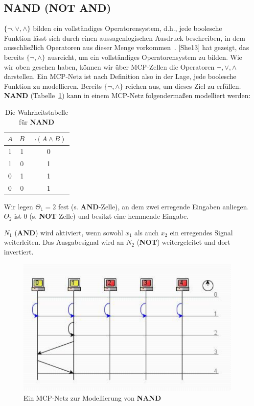 {\subsection*{NAND (NOT AND)}

$\{\neg, \lor, \land\}$ bilden ein vollständiges Operatorensystem, d.h., jede boolesche Funktion lässt sich durch einen aussagenlogischen Ausdruck  beschreiben, in dem ausschließlich Operatoren aus dieser Menge vorkommen~\cite[89]{Hof22}.
[She13] hat gezeigt, das bereits $\{\neg, \land\}$  ausreicht, um ein vollständiges Operatorensystem zu bilden.
Wie wir oben gesehen haben, können wir über MCP-Zellen die Operatoren $\neg, \lor, \land$ darstellen.
Ein MCP-Netz ist nach Definition also in der Lage, jede boolesche Funktion zu modellieren.
Bereits $\{\neg, \land\}$ reichen aus, um dieses Ziel zu erfüllen. \textbf{NAND} (Tabelle~\ref{tab:nand}) kann in einem MCP-Netz folgendermaßen modelliert werden:

\begin{table} %
    \centering
    \begin{tabular}{c | c | c}
        $A$ & $B$ & $\neg(A \land B)$ \\
        \hline
        1   & 1   & 0           \\
        1   & 0   & 1           \\
        0   & 1   & 1           \\
        0   & 0   & 1           \\
    \end{tabular}
    \caption{Die Wahrheitstabelle für \textbf{NAND}}
    \label{tab:nand}
\end{table}


Wir legen $\Theta_1 = 2$ fest (s. \textbf{AND}-Zelle), an dem zwei erregende Eingaben anliegen. $\Theta_2$ ist $0$ (s. \textbf{NOT}-Zelle) und besitzt eine hemmende Eingabe.

$N_1$ (\textbf{AND}) wird aktiviert, wenn sowohl $x_1$ als auch $x_2$ ein erregendes Signal weiterleiten. Das Ausgabesignal wird an $N_2$ (\textbf{NOT}) weitergeleitet und dort invertiert.


\begin{figure}[h]
    \centering
    \includegraphics{images/p1ReadSeq.pdf}
    \caption{Ein MCP-Netz zur Modellierung von \textbf{NAND}}
    \label{fig-mcpnand}
\end{figure}


}
